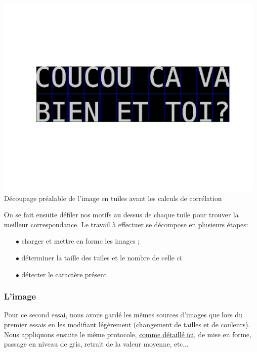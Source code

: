 \documentclass[a4paper,12pt,titlepage]{report}
\begin{document}
	\begin{center}
		\includegraphics[scale=0.4]{../illus/tuiles.png}\\
		Découpage préalable de l'image en tuiles avant les calculs de corrélation
	\end{center}
	
	On se fait ensuite défiler nos motifs au dessus de chaque tuile pour trouver la meilleur correspondance.
	Le travail à effectuer se décompose en plusieurs étapes:
		\begin{itemize}
			\item[$\bullet$] charger et mettre en forme les images ;
			\item[$\bullet$] déterminer la taille des tuiles et le nombre de celle ci
			\item[$\bullet$] détecter le caractère présent
		\end{itemize}
	\subsubsection{L'image}
	Pour ce second essai, nous avons gardé les mêmes sources d'images que lors du premier essais en les modifiant légèrement (changement de tailles et de couleurs). Nous appliquons ensuite le même protocole, \hyperref[image]{comme détaillé ici}, de mise en forme, passage en niveau de gris, retrait de la valeur moyenne, etc... 
\end{document}
